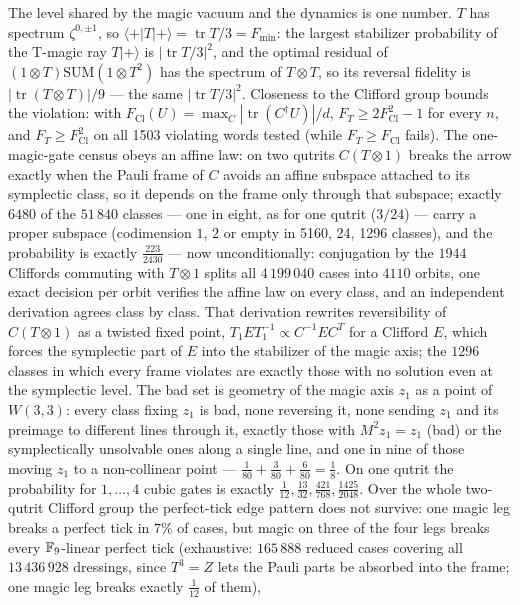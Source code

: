 The level shared by the magic vacuum and the dynamics is one number. $T$ has spectrum $\zeta^{0,\pm1}$, so
$\langle+|T|+\rangle=\operatorname{tr}T/3=F_{\min}$: the largest stabilizer probability of the T-magic ray $T|+\rangle$ is
$|\operatorname{tr}T/3|^2$, and the optimal residual of $(1\otimes T)\mathrm{SUM}(1\otimes T^2)$ has the spectrum of
$T\otimes T$, so its reversal fidelity is $|\operatorname{tr}(T\otimes T)|/9$ --- the same $|\operatorname{tr}T/3|^2$.
Closeness to the Clifford group bounds the violation: with $F_{\mathrm{Cl}}(U)=\max_C|\operatorname{tr}(C^\dagger U)|/d$,
$F_T\ge2F_{\mathrm{Cl}}^2-1$ for every $n$, and $F_T\ge F_{\mathrm{Cl}}^2$ on all 1503 violating words tested
(while $F_T\ge F_{\mathrm{Cl}}$ fails). The one-magic-gate census obeys an affine law: on two qutrits $C(T\otimes1)$ breaks the arrow
exactly when the Pauli frame of $C$ avoids an affine subspace attached to its symplectic class, so it depends on the
frame only through that subspace; exactly $6480$ of the $51\,840$ classes --- one in eight, as
for one qutrit ($3/24$) --- carry a proper subspace (codimension $1$, $2$ or empty in 5160, 24, 1296 classes),
and the probability is exactly $\tfrac{223}{2430}$ --- now unconditionally: conjugation by the $1944$ Cliffords commuting
with $T\otimes1$ splits all $4\,199\,040$ cases into $4110$ orbits, one exact decision per orbit verifies the affine law
on every class, and an independent derivation agrees class by class. That derivation rewrites reversibility of
$C(T\otimes1)$ as a twisted fixed point, $T_1ET_1^{-1}\propto C^{-1}EC^{T}$ for a Clifford $E$, which forces the symplectic
part of $E$ into the stabilizer of the magic axis; the $1296$ classes in which every frame violates are exactly those
with no solution even at the symplectic level. The bad set is geometry of the magic axis $z_1$ as a point of $W(3,3)$:
every class fixing $z_1$ is bad, none reversing it, none sending $z_1$ and its preimage to different lines through it,
exactly those with $M^2z_1=z_1$ (bad) or the symplectically unsolvable ones along a single line, and one in nine of
those moving $z_1$ to a non-collinear point --- $\tfrac1{80}+\tfrac3{80}+\tfrac6{80}=\tfrac18$. On one qutrit the probability for $1,\dots,4$
cubic gates is exactly $\tfrac1{12},\tfrac{13}{32},\tfrac{421}{768},\tfrac{1425}{2048}$. Over the whole two-qutrit
Clifford group the perfect-tick edge pattern does not survive: one magic leg breaks a perfect tick in $7\%$ of cases,
but magic on three of the four legs breaks every $\mathbb{F}_9$-linear perfect tick (exhaustive: $165\,888$ reduced cases covering all $13\,436\,928$ dressings, since $T^3=Z$ lets the Pauli parts be absorbed into the frame; one magic leg breaks exactly $\tfrac1{12}$ of them),
